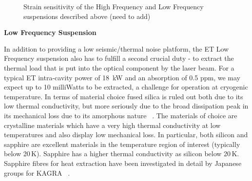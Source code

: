 \begin{center}
\begin{figure}
\label{strain_susp}
\caption{Strain sensitivity of the High Frequency and Low Frequency suspensions described above (need to add)}
\end{figure}
\end{center}
{\bf Low Frequency Suspension}

In addition to providing a low seismic/thermal noise platform, the ET Low Frequency suspension also has to fulfill a second crucial duty - to extract the thermal load that is put into the optical component by the laser beam. For a typical ET intra-cavity power of 18~kW and an absorption of 0.5 ppm, we may expect up to 10 milliWatts to be extracted, a challenge for operation at cryogenic temperature. In terms of material choice fused silica is ruled out both due to its low thermal conductivity, but more seriously due to the broad dissipation peak in its mechanical loss due to its amorphous nature ~\cite{McGuigan1978}. The materials of choice are crystalline materials which have a very high thermal conductivity at low temperatures and also display low mechanical loss. In particular, both silicon and sapphire are excellent materials in the temperature region of interest (typically below 20\,K). Sapphire has a higher thermal conductivity as silicon below 20\,K. Sapphire fibres for heat extraction have been investigated in detail by Japanese groups for KAGRA \cite{KAGRA:2014}~\cite{KAGRA:2016}.


